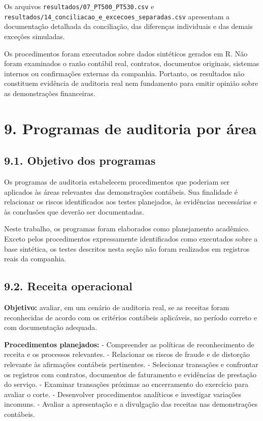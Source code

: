 \documentclass[
]{article}
\begin{document}
Os arquivos \texttt{resultados/07\_PT500\_PT530.csv} e
\texttt{resultados/14\_conciliacao\_e\_excecoes\_separadas.csv}
apresentam a documentação detalhada da conciliação, das diferenças
individuais e das demais exceções simuladas.

Os procedimentos foram executados sobre dados sintéticos gerados em R.
Não foram examinados o razão contábil real, contratos, documentos
originais, sistemas internos ou confirmações externas da companhia.
Portanto, os resultados não constituem evidência de auditoria real nem
fundamento para emitir opinião sobre as demonstrações financeiras.

\section{9. Programas de auditoria por
área}\label{programas-de-auditoria-por-uxe1rea}

\subsection{9.1. Objetivo dos programas}\label{objetivo-dos-programas}

Os programas de auditoria estabelecem procedimentos que poderiam ser
aplicados às áreas relevantes das demonstrações contábeis. Sua
finalidade é relacionar os riscos identificados aos testes planejados,
às evidências necessárias e às conclusões que deverão ser documentadas.

Neste trabalho, os programas foram elaborados como planejamento
acadêmico. Exceto pelos procedimentos expressamente identificados como
executados sobre a base sintética, os testes descritos nesta seção não
foram realizados em registros reais da companhia.

\subsection{9.2. Receita operacional}\label{receita-operacional}

\textbf{Objetivo:} avaliar, em um cenário de auditoria real, se as
receitas foram reconhecidas de acordo com os critérios contábeis
aplicáveis, no período correto e com documentação adequada.

\textbf{Procedimentos planejados:} - Compreender as políticas de
reconhecimento de receita e os processos relevantes. - Relacionar os
riscos de fraude e de distorção relevante às afirmações contábeis
pertinentes. - Selecionar transações e confrontar os registros com
contratos, documentos de faturamento e evidências de prestação do
serviço. - Examinar transações próximas ao encerramento do exercício
para avaliar o corte. - Desenvolver procedimentos analíticos e
investigar variações incomuns. - Avaliar a apresentação e a divulgação
das receitas nas demonstrações contábeis.
\end{document}
